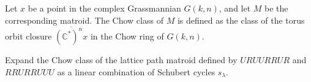 Let $x$ be a point in the complex Grassmannian $G(k,n)$, and let $M$ be the corresponding matroid. The Chow class of $M$ is defined as the class of the torus orbit closure $\overline{(\mathbb C^*)^n x}$ in the Chow ring of $G(k,n)$.

Expand the Chow class of the lattice path matroid defined by $URUURRUR$ and $RRURRUUU$ as a linear combination of Schubert cycles $s_{\lambda}$.
